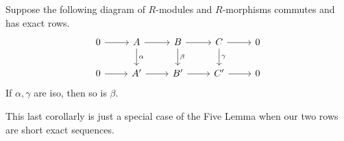 \documentclass[twoside,10pt]{report}
\begin{document}
\begin{cor}
Suppose the following diagram of $R$-modules and $R$-morphisms commutes and has exact rows.
\[
\begin{tikzcd}
	0\rar & A\rar\dar{\alpha} & B\rar\dar{\beta} & C\rar\dar{\gamma} & 0 \\
        0\rar & A'\rar & B'\rar & C'\rar & 0
\end{tikzcd}
\] 
If $\alpha,\gamma$ are iso, then so is $\beta$.
\end{cor}

This last corollarly is just a special case of the Five Lemma when our two rows are short exact sequences. 

\end{document}
